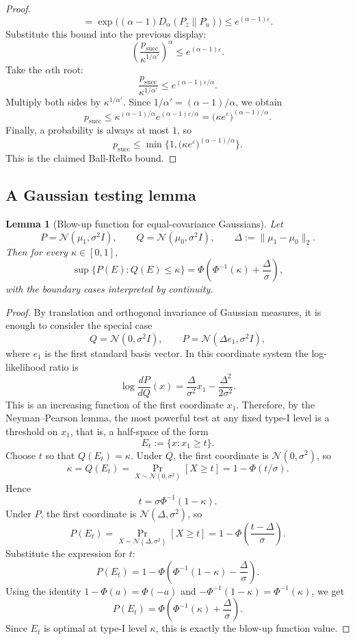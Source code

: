 \documentclass[conference,compsoc]{IEEEtran}
\newtheorem{lemma}{Lemma}
\begin{document}
\begin{proof}
\[=
\exp\big((\alpha-1)D_\alpha(P_z\|P_u)\big)
\le
 e^{(\alpha-1)\varepsilon}.
\]
Substitute this bound into the previous display:
\[
\left(\frac{p_{\mathrm{succ}}}{\kappa^{1/\alpha'}}\right)^\alpha
\le
 e^{(\alpha-1)\varepsilon}.
\]
Take the $\alpha$th root:
\[
\frac{p_{\mathrm{succ}}}{\kappa^{1/\alpha'}}
\le
 e^{(\alpha-1)\varepsilon/\alpha}.
\]
Multiply both sides by $\kappa^{1/\alpha'}$. Since $1/\alpha'=(\alpha-1)/\alpha$, we obtain
\[
p_{\mathrm{succ}}
\le
\kappa^{(\alpha-1)/\alpha}e^{(\alpha-1)\varepsilon/\alpha}
=
\big(\kappa e^{\varepsilon}\big)^{(\alpha-1)/\alpha}.
\]
Finally, a probability is always at most $1$, so
\[
p_{\mathrm{succ}}
\le
\min\Big\{1,\big(\kappa e^{\varepsilon}\big)^{(\alpha-1)/\alpha}\Big\}.
\]
This is the claimed Ball-ReRo bound.
\end{proof}

\subsection{A Gaussian testing lemma}

\begin{lemma}[Blow-up function for equal-covariance Gaussians]
\label{lem:gaussian-blowup}
Let
\[
P=\mathcal{N}(\mu_1,\sigma^2 I),
\qquad
Q=\mathcal{N}(\mu_0,\sigma^2 I),
\qquad
\Delta:=\|\mu_1-\mu_0\|_2.
\]
Then for every $\kappa\in[0,1]$,
\[
\sup\{P(E): Q(E)\le \kappa\}
=
\Phi\!\left(\Phi^{-1}(\kappa)+\frac{\Delta}{\sigma}\right),
\]
with the boundary cases interpreted by continuity.
\end{lemma}

\begin{proof}
By translation and orthogonal invariance of Gaussian measures, it is enough to consider the special case
\[
Q=\mathcal{N}(0,\sigma^2 I),
\qquad
P=\mathcal{N}(\Delta e_1,\sigma^2 I),
\]
where $e_1$ is the first standard basis vector. In this coordinate system the log-likelihood ratio is
\[
\log\frac{dP}{dQ}(x)
=
\frac{\Delta}{\sigma^2}x_1-\frac{\Delta^2}{2\sigma^2}.
\]
This is an increasing function of the first coordinate $x_1$. Therefore, by the Neyman--Pearson lemma, the most powerful test at any fixed type-I level is a threshold on $x_1$, that is, a half-space of the form
\[
E_t:=\{x: x_1\ge t\}.
\]
Choose $t$ so that $Q(E_t)=\kappa$. Under $Q$, the first coordinate is $\mathcal{N}(0,\sigma^2)$, so
\[
\kappa=Q(E_t)=\Pr_{X\sim\mathcal{N}(0,\sigma^2)}[X\ge t]
=1-\Phi(t/\sigma).
\]
Hence
\[
t=\sigma\Phi^{-1}(1-\kappa).
\]
Under $P$, the first coordinate is $\mathcal{N}(\Delta,\sigma^2)$, so
\[
P(E_t)
=
\Pr_{X\sim\mathcal{N}(\Delta,\sigma^2)}[X\ge t]
=
1-\Phi\!\left(\frac{t-\Delta}{\sigma}\right).
\]
Substitute the expression for $t$:
\[
P(E_t)
=
1-\Phi\!\left(\Phi^{-1}(1-\kappa)-\frac{\Delta}{\sigma}\right).
\]
Using the identity $1-\Phi(a)=\Phi(-a)$ and $-\Phi^{-1}(1-\kappa)=\Phi^{-1}(\kappa)$, we get
\[
P(E_t)
=
\Phi\!\left(\Phi^{-1}(\kappa)+\frac{\Delta}{\sigma}\right).
\]
Since $E_t$ is optimal at type-I level $\kappa$, this is exactly the blow-up function value.
\end{proof}
\end{document}
